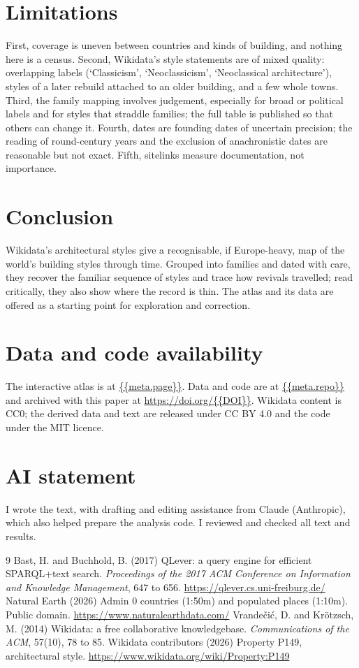 \documentclass[11pt,a4paper]{article}
\begin{document}
\section{Limitations}
First, coverage is uneven between countries and kinds of building, and nothing here is a census. Second, Wikidata's style statements are of mixed quality: overlapping labels (`Classicism', `Neoclassicism', `Neoclassical architecture'), styles of a later rebuild attached to an older building, and a few whole towns. Third, the family mapping involves judgement, especially for broad or political labels and for styles that straddle families; the full table is published so that others can change it. Fourth, dates are founding dates of uncertain precision; the reading of round-century years and the exclusion of anachronistic dates are reasonable but not exact. Fifth, sitelinks measure documentation, not importance.

\section{Conclusion}
Wikidata's architectural styles give a recognisable, if Europe-heavy, map of the world's building styles through time. Grouped into families and dated with care, they recover the familiar sequence of styles and trace how revivals travelled; read critically, they also show where the record is thin. The atlas and its data are offered as a starting point for exploration and correction.

\section*{Data and code availability}
The interactive atlas is at \url{{{meta.page}}}. Data and code are at \url{{{meta.repo}}} and archived with this paper at \url{https://doi.org/{{DOI}}}. Wikidata content is CC0; the derived data and text are released under CC BY 4.0 and the code under the MIT licence.

\section*{AI statement}
I wrote the text, with drafting and editing assistance from Claude (Anthropic), which also helped prepare the analysis code. I reviewed and checked all text and results.

\begin{thebibliography}{9}
 Bast, H. and Buchhold, B. (2017) QLever: a query engine for efficient SPARQL+text search. \emph{Proceedings of the 2017 ACM Conference on Information and Knowledge Management}, 647 to 656. \url{https://qlever.cs.uni-freiburg.de/}
 Natural Earth (2026) Admin 0 countries (1:50m) and populated places (1:10m). Public domain. \url{https://www.naturalearthdata.com/}
 Vrandečić, D. and Krötzsch, M. (2014) Wikidata: a free collaborative knowledgebase. \emph{Communications of the ACM}, 57(10), 78 to 85.
 Wikidata contributors (2026) Property P149, architectural style. \url{https://www.wikidata.org/wiki/Property:P149}
\end{thebibliography}
\end{document}
